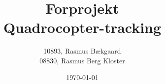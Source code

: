 \documentclass[oneside, 12pt]{memoir}
\title{Forprojekt \\ Quadrocopter-tracking}
\date{\today}
\author{10893, Rasmus Bækgaard\\08830, Rasmus Berg Kloster}
\begin{document}
\begin{titlingpage}
  \maketitle
\end{titlingpage}

\newpage
\tableofcontents*






\newpage

\end{document}
